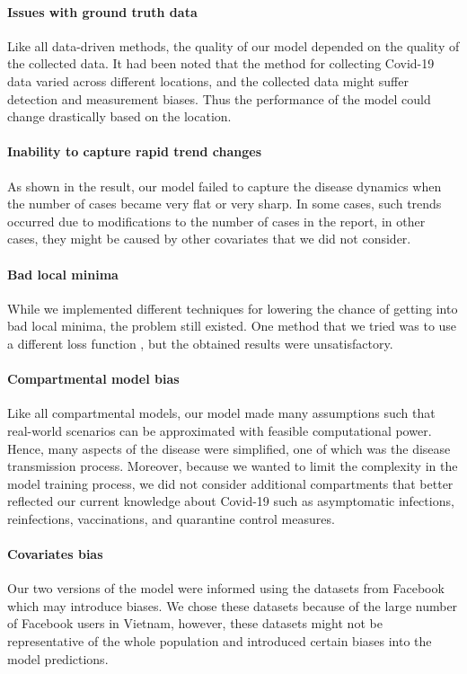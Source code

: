 \paragraph{Issues with ground truth data}
Like all data-driven methods, the quality of our model depended on the quality of the collected data.
It had been noted that the method for collecting Covid-19 data varied across different locations, and the collected data might suffer detection and measurement biases.
Thus the performance of the model could change drastically based on the location.

\paragraph{Inability to capture rapid trend changes}
As shown in the result, our model failed to capture the disease dynamics when the number of cases became very flat or very sharp.
In some cases, such trends occurred due to modifications to the number of cases in the report, in other cases, they might be caused by other covariates that we did not consider.

\paragraph{Bad local minima}
While we implemented different techniques for lowering the chance of getting into bad local minima, the problem still existed.
One method that we tried was to use a different loss function \cite{vortmeyer-kleyTrajectorybasedLossFunction2021}, but the obtained results were unsatisfactory.

\paragraph{Compartmental model bias}
Like all compartmental models, our model made many assumptions such that real-world scenarios can be approximated with feasible computational power.
Hence, many aspects of the disease were simplified, one of which was the disease transmission process.
Moreover, because we wanted to limit the complexity in the model training process, we did not consider additional compartments that better reflected our current knowledge about Covid-19 such as asymptomatic infections, reinfections, vaccinations, and quarantine control measures.

\paragraph{Covariates bias}
Our two versions of the model were informed using the datasets from Facebook which may introduce biases.
We chose these datasets because of the large number of Facebook users in Vietnam, however, these datasets might not be representative of the whole population and introduced certain biases into the model predictions.

